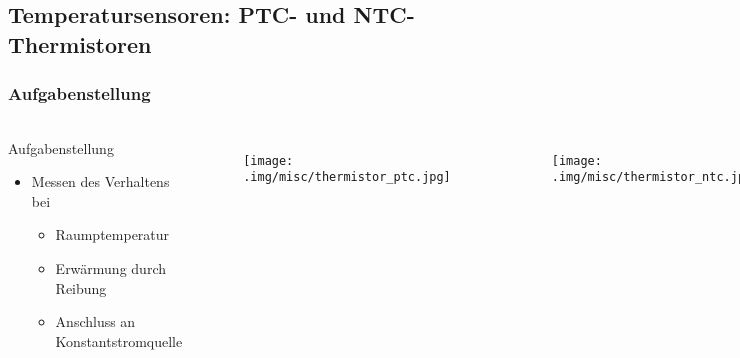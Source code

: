 \subsection{Temperatursensoren: PTC- und NTC-Thermistoren} %
\label{sub:Temperatursensoren: PTC- und NTC-Thermistoren}
\begin{frame}
    \frametitle{Aufgabenstellung}
    \framesubtitle{}
    \begin{columns}[c]
            \begin{block}{Aufgabenstellung}
                 \begin{itemize}
                     \item Messen des Verhaltens bei
                        \begin{itemize}
                            \item Raumptemperatur
                            \item Erwärmung durch Reibung
                            \item Anschluss an Konstantstromquelle
                        \end{itemize}
                 \end{itemize}
            \end{block}
            \begin{figure}[H]
            \begin{center}
                    \texttt{[image: .img/misc/thermistor\_ptc.jpg]}
            \end{center}
            \end{figure}
            \begin{figure}[H]
            \begin{center}
                    \texttt{[image: .img/misc/thermistor\_ntc.jpg]}
            \end{center}
            \end{figure}
    \end{columns}
\end{frame}
